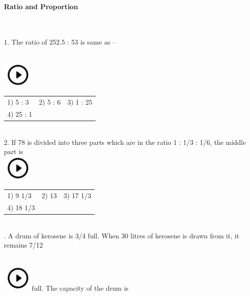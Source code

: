 \documentclass{article}
\begin{document}
	\noindent \begin{center}
		{\Large \textbf{Ratio and Proportion \\}}
	\end{center}
	
	



\noindent \\  

\noindent  \\   1.   The ratio of 252.5 : 53 is same as --

\noindent  
	\noindent \\ \includegraphics*[width=0.60in, height=0.52in]{images/image1}
	
\begin{tabular}{p{1.7in} p{1.6in} p{1.6in}} \\ 
 1) 5 : 3                     &  2) 5 : 6              &  3) 1 : 25             \\
4) 25 : 1 \\
\end{tabular}

\noindent  \\  

2.   If  78 is divided into three parts which are in the ratio 1 : 1/3 : 1/6, the middle part is  
	\noindent \\ \includegraphics*[width=0.60in, height=0.52in]{images/image1}\begin{tabular}{p{1.7in} p{1.6in} p{1.6in}} \\ 
 1) 9 1/3                    &  2) 13                 &  3) 17 1/3           \\
4) 18 1/3 \\
\end{tabular}

\noindent  \\  

.   A drum of kerosene is 3/4 full. When 30 litres of kerosene is drawn from it, it remains 7/12

\noindent  
	\noindent \\ \includegraphics*[width=0.60in, height=0.52in]{images/image1}full. The capacity of the drum is
\end{document}

